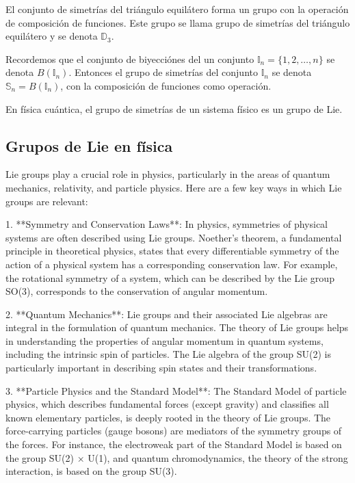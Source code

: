 \documentclass{article}
\begin{document}
El conjunto de simetrías del triángulo equilátero forma un grupo con la operación de composición de funciones. Este grupo se llama grupo de simetrías del triángulo equilátero y se denota $\mathbb{D}_3$.

Recordemos que el conjunto de biyecciónes del un conjunto $\mathbb{I}_n = \{1, 2, \ldots, n\}$ se denota $B(\mathbb{I}_n)$.
Entonces el grupo de simetrías del conjunto $\mathbb{I}_n$ se denota $\mathbb{S}_n = B(\mathbb{I}_n)$, con la composición de funciones como operación.

En física cuántica, el grupo de simetrías de un sistema físico es un grupo de Lie.

\subsection{Grupos de Lie en física}

Lie groups play a crucial role in physics, particularly in the areas of quantum mechanics, relativity, and particle physics. Here are a few key ways in which Lie groups are relevant:

1. **Symmetry and Conservation Laws**: In physics, symmetries of physical systems are often described using Lie groups. Noether's theorem, a fundamental principle in theoretical physics, states that every differentiable symmetry of the action of a physical system has a corresponding conservation law. For example, the rotational symmetry of a system, which can be described by the Lie group SO(3), corresponds to the conservation of angular momentum.

2. **Quantum Mechanics**: Lie groups and their associated Lie algebras are integral in the formulation of quantum mechanics. The theory of Lie groups helps in understanding the properties of angular momentum in quantum systems, including the intrinsic spin of particles. The Lie algebra of the group SU(2) is particularly important in describing spin states and their transformations.

3. **Particle Physics and the Standard Model**: The Standard Model of particle physics, which describes fundamental forces (except gravity) and classifies all known elementary particles, is deeply rooted in the theory of Lie groups. The force-carrying particles (gauge bosons) are mediators of the symmetry groups of the forces. For instance, the electroweak part of the Standard Model is based on the group SU(2) × U(1), and quantum chromodynamics, the theory of the strong interaction, is based on the group SU(3).
\end{document}
